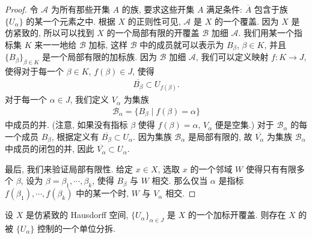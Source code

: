 \documentclass[../../main.tex]{subfiles}
\begin{document}
\begin{proof}
令 $\mathcal{A}$ 为所有那些开集 $A$ 的族, 要求这些开集 $A$ 满足条件: $\overline{A}$ 包含于族 $\{U_\alpha\}$ 的某一个元素之中. 根据 $X$ 的正则性可见, $\mathcal{A}$ 是 $X$ 的一个覆盖. 因为 $X$ 是仿紧致的, 所以可以找到 $X$ 的一个局部有限的开覆盖 $\mathcal{B}$ 加细 $\mathcal{A}$. 我们用某一个指标集 $K$ 来一一地给 $\mathcal{B}$ 加标, 这样 $\mathcal{B}$ 中的成员就可以表示为 $B_\beta$, $\beta\in K$, 并且 $\{B_\beta\}_{\beta\in K}$ 是一个局部有限的加标族. 因为 $\mathcal{B}$ 加细 $\mathcal{A}$, 我们可以定义映射 $f\colon K\to J$, 使得对于每一个 $\beta\in K$, $f(\beta)\in J$, 使得
\begin{align*}
\overline{B_\beta}\subset U_{f(\beta)}.
\end{align*}
对于每一个 $\alpha\in J$, 我们定义 $V_\alpha$ 为集族
\begin{align*}
\mathcal{B}_\alpha=\{B_\beta\mid f(\beta)=\alpha\}
\end{align*}
中成员的并. (注意, 如果没有指标 $\beta$ 使得 $f(\beta)=\alpha$, $V_\alpha$ 便是空集.) 对于 $\mathcal{B}_\alpha$ 的每一个成员 $B_\beta$, 根据定义有 $\overline{B_\beta}\subset U_\alpha$. 因为集族 $\mathcal{B}_\alpha$ 是局部有限的, 故 $\overline{V_\alpha}$ 为集族 $\mathcal{B}_\alpha$ 中成员的闭包的并, 因此 $\overline{V_\alpha}\subset U_\alpha$.

最后, 我们来验证局部有限性. 给定 $x\in X$, 选取 $x$ 的一个邻域 $W$ 使得只有有限多个 $\beta$, 设为 $\beta=\beta_1,\cdots,\beta_k$, 使得 $B_\beta$ 与 $W$ 相交. 那么仅当 $\alpha$ 是指标 $f(\beta_1),\cdots,f(\beta_k)$ 中的某一个时, $W$ 与 $V_\alpha$ 相交.
\end{proof}

\begin{theorem}\label{theorem:ch06-partition-of-unity-existence}
设 $X$ 是仿紧致的 Hausdorff 空间, $\{U_\alpha\}_{\alpha\in J}$ 是 $X$ 的一个加标开覆盖. 则存在 $X$ 的被 $\{U_\alpha\}$ 控制的一个单位分拆.
\end{theorem}
\end{document}
